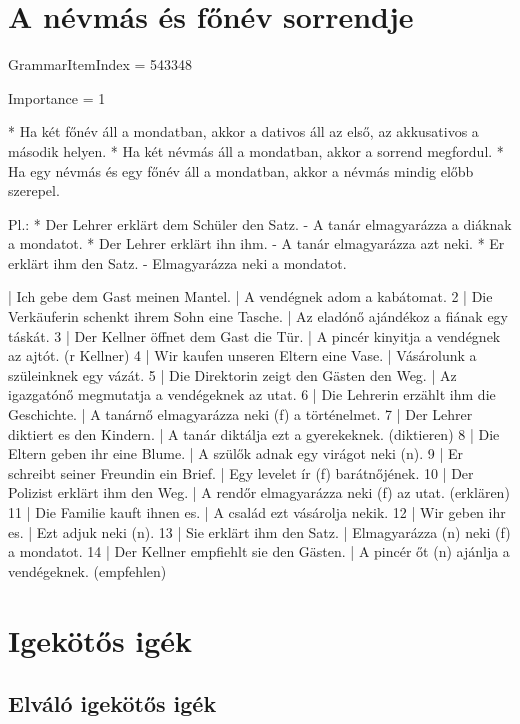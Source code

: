 \documentclass{article}
\newenvironment{desc}{\verbatim}{\endverbatim}
\newenvironment{exmp}{\verbatim}{\endverbatim}
\begin{document}
\section{A névmás és főnév sorrendje}

GrammarItemIndex = 543348

Importance = 1

\begin{desc}
* Ha két főnév áll a mondatban, akkor a dativos áll az első, az akkusativos a második helyen.
* Ha két névmás áll a mondatban, akkor a sorrend megfordul.
* Ha egy névmás és egy főnév áll a mondatban, akkor a névmás mindig előbb szerepel.

Pl.: * Der Lehrer erklärt dem Schüler den Satz. - A tanár elmagyarázza a diáknak a mondatot.
* Der Lehrer erklärt ihn ihm. - A tanár elmagyarázza azt neki.
* Er erklärt ihm den Satz. - Elmagyarázza neki a mondatot.
\end{desc}

\begin{exmp}
1 | Ich gebe dem Gast meinen Mantel. | A vendégnek adom a kabátomat.
2 | Die Verkäuferin schenkt ihrem Sohn eine Tasche. | Az eladónő ajándékoz a fiának egy táskát.
3 | Der Kellner öffnet dem Gast die Tür. | A pincér kinyitja a vendégnek az ajtót. (r Kellner)
4 | Wir kaufen unseren Eltern eine Vase. | Vásárolunk a szüleinknek egy vázát.
5 | Die Direktorin zeigt den Gästen den Weg. | Az igazgatónő megmutatja a vendégeknek az utat.
6 | Die Lehrerin erzählt ihm die Geschichte. | A tanárnő elmagyarázza neki (f) a történelmet.
7 | Der Lehrer diktiert es den Kindern. | A tanár diktálja ezt a gyerekeknek. (diktieren)
8 | Die Eltern geben ihr eine Blume. | A szülők adnak egy virágot neki (n).
9 | Er schreibt seiner Freundin ein Brief. | Egy levelet ír (f) barátnőjének.
10 | Der Polizist erklärt ihm den Weg. | A rendőr elmagyarázza neki (f) az utat. (erklären)
11 | Die Familie kauft ihnen es. | A család ezt vásárolja nekik.
12 | Wir geben ihr es. | Ezt adjuk neki (n).
13 | Sie erklärt ihm den Satz. | Elmagyarázza (n) neki (f) a mondatot.
14 | Der Kellner empfiehlt sie den Gästen. | A pincér őt (n) ajánlja a vendégeknek. (empfehlen)
\end{exmp}

\section{Igekötős igék}

\subsection{Elváló igekötős igék}
\end{document}
